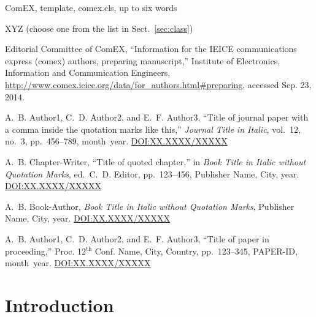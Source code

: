 \documentclass{comex}
\begin{document}
\begin{keywords}
ComEX, template, comex.cls, up to six words
\end{keywords}

\begin{classification}
XYZ (choose one from the list in Sect.~\ref{sec:class})
\end{classification}


\begin{thebibliography}{1} \providecommand{\urlstyle}[1]{} \urlstyle{rm}

{Editorial Committee of ComEX}, ``Information for the {IEICE} communications
  express (comex) authors, preparing manuscript,'' Institute of Electronics,
  Information and Communication Engineers,
  \url{http://www.comex.ieice.org/data/for_authors.html#preparing}, accessed
  Sep. 23, 2014.

A.~B. Author1, C.~D. Author2, and E.~F. Author3, ``Title of journal paper with
  a comma inside the quotation marks like this,'' {\em Journal Title in
  Italic}, vol.~12, no.~3, pp.~456--789, month\ year.
\newblock \url{DOI:XX.XXXX/XXXXX}

A.~B. Chapter-Writer, ``Title of quoted chapter,'' in {\it Book Title in Italic
  without Quotation Marks}, ed.~C.~D. Editor, pp.~123--456, Publisher Name,
  City, year.
\newblock \url{DOI:XX.XXXX/XXXXX}

A.~B. Book-Author, {\em Book Title in Italic without Quotation Marks},
  Publisher Name, City, year.
\newblock \url{DOI:XX.XXXX/XXXXX}

A.~B. Author1, C.~D. Author2, and E.~F. Author3, ``Title of paper in
  proceeding,'' Proc. 12$^{\mathrm{th}}$ Conf. Name, City, Country,
  pp.~123--345, PAPER-ID, month\ year.
\newblock \url{DOI:XX.XXXX/XXXXX}

\end{thebibliography}


\section{Introduction}
\end{document}
